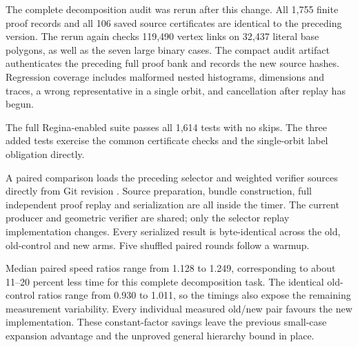 The complete decomposition audit was rerun after this change. All 1,755
finite proof records and all 106 saved source certificates are identical to
the preceding version. The rerun again checks 119,490 vertex links on
32,437 literal base polygons, as well as the seven large binary cases.
The compact audit artifact authenticates the preceding full proof bank and
records the new source hashes. Regression coverage includes malformed nested
histograms, dimensions and traces, a wrong representative in a single orbit,
and cancellation after replay has begun.

The full Regina-enabled suite passes all 1,614 tests with no skips. The
three added tests exercise the common certificate checks and the single-orbit
label obligation directly.

A paired comparison loads the preceding selector and weighted verifier
sources directly from Git revision . Source preparation,
bundle construction, full independent proof replay and serialization are all
inside the timer. The current producer and geometric verifier are shared;
only the selector replay implementation changes. Every serialized result is
byte-identical across the old, old-control and new arms. Five shuffled paired
rounds follow a warmup.



Median paired speed ratios range from 1.128 to 1.249, corresponding to about
11--20 percent less time for this complete decomposition task. The identical
old-control ratios range from 0.930 to 1.011, so the timings also expose the
remaining measurement variability. Every individual measured old/new pair
favours the new implementation. These constant-factor savings leave the
previous small-case expansion advantage and the unproved general hierarchy
bound in place.

